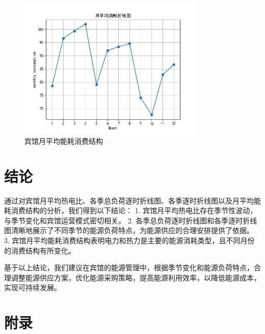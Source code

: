 \documentclass[UTF8]{ctexart}
\begin{document}
\begin{figure}[H]
    \centering
    \includegraphics[width=0.8\textwidth]{image/Figure_4.png}
    \caption{宾馆月平均能耗消费结构}
    \label{fig:monthly_energy_consumption_structure}
\end{figure}

\section{结论}
通过对宾馆月平均热电比、各季总负荷逐时折线图、各季逐时折线图以及月平均能耗消费结构的分析，我们得到以下结论：
1. 宾馆月平均热电比存在季节性波动，与季节变化和宾馆运营模式密切相关。
2. 各季总负荷逐时折线图和各季逐时折线图清晰地展示了不同季节的能源负荷特点，为能源供应的合理安排提供了依据。
3. 宾馆月平均能耗消费结构表明电力和热力是主要的能源消耗类型，且不同月份的消费结构有所变化。

基于以上结论，我们建议在宾馆的能源管理中，根据季节变化和能源负荷特点，合理调整能源供应方案，优化能源采购策略，提高能源利用效率，以降低能源成本，实现可持续发展。

\section{附录}
\end{document}

